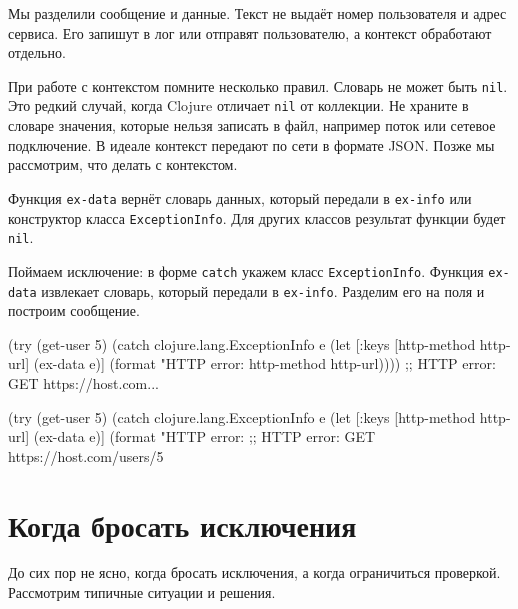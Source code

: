 Мы разделили сообщение и данные. Текст не выдаёт номер пользователя и адрес
сервиса. Его запишут в лог или отправят пользователю, а контекст обработают
отдельно.

При работе с контекстом помните несколько правил. Словарь не может быть
\verb|nil|. Это редкий случай, когда Clojure отличает \verb|nil| от
коллекции. Не храните в словаре значения, которые нельзя записать в файл,
например поток или сетевое подключение. В идеале контекст передают по сети в
формате JSON. Позже мы рассмотрим, что делать с контекстом.

Функция \verb|ex-data| вернёт словарь данных, который передали в \verb|ex-info|
или конструктор класса \verb|ExceptionInfo|. Для других классов результат
функции будет \verb|nil|.


Поймаем исключение: в форме \verb|catch| укажем класс
\texttt{Exception\-Info}. Функция \verb|ex-data| извлекает словарь, который передали
в \verb|ex-info|. Разделим его на поля и построим сообщение.

\ifnarrow

\begin{english}
  \begin{clojure}
(try
  (get-user 5)
  (catch clojure.lang.ExceptionInfo e
    (let [{:keys [http-method http-url]}
          (ex-data e)]
      (format "HTTP error: %
        http-method http-url))))
;; HTTP error: GET https://host.com...
  \end{clojure}
\end{english}

\else

\begin{english}
  \begin{clojure}
(try
  (get-user 5)
  (catch clojure.lang.ExceptionInfo e
    (let [{:keys [http-method http-url]} (ex-data e)]
      (format "HTTP error: %
;; HTTP error: GET https://host.com/users/5
  \end{clojure}
\end{english}

\fi

\section{Когда бросать исключения}

До сих пор не ясно, когда бросать исключения, а когда ограничиться
проверкой. Рассмотрим типичные ситуации и решения.

